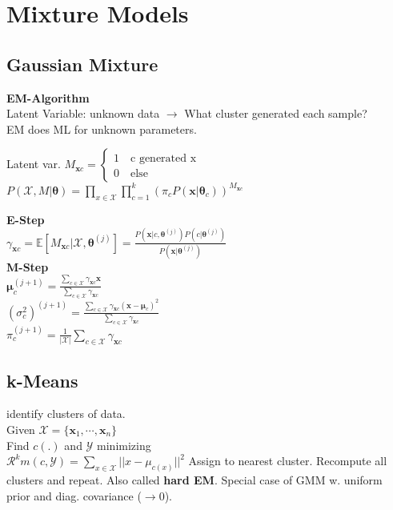 \section*{Mixture Models}

\subsection*{Gaussian Mixture}
\textbf{EM-Algorithm}\\
Latent Variable: unknown data $\rightarrow$ What cluster generated each sample?\\
EM does ML for unknown parameters.

Latent var. $M_{\mathbf{x}c}{=}\begin{cases} 
       1 \quad \text{c generated x}\\
       0 \quad \text{else}
       \end{cases} 
$\\
$P(\mathcal{X}, M|\mathbf{\theta}){=}\prod_{x\in\mathcal{X}}\prod_{c=1}^k(\pi_cP(\mathbf{x}|\mathbf{\theta}_c))^{M_{\mathbf{x}c}}$

\textbf{E-Step}\\
$ \gamma_{\mathbf{x}c}{=}\mathbb{E}[M_{\mathbf{x}c}|\mathcal{X},\mathbf{\theta}^{(j)}]{=}\frac{P(\mathbf{x}|c,\mathbf{\theta}^{(j)})P(c|\mathbf{\theta}^{(j)})}{P(\mathbf{x}|\mathbf{\theta}^{(j)})}$\\
\textbf{M-Step}\\
$\mathbf{\mu}_c^{(j+1)}=\frac{\sum_{c\in\mathcal{X}}\gamma_{\mathbf{x}c}\mathbf{x}}{\sum_{c\in\mathcal{X}}\gamma_{\mathbf{x}c}}$\\
$(\sigma_c^2)^{(j+1)}=\frac{\sum_{c\in\mathcal{X}}\gamma_{\mathbf{x}c}(\mathbf{x}-\mathbf{\mu}_c)^2}{\sum_{c\in\mathcal{X}}\gamma_{\mathbf{x}c}}$\\
$\pi_c^{(j+1)}=\frac{1}{|\mathcal{X}|}\sum_{c\in\mathcal{X}}\gamma_{\mathbf{x}c}$\\

\subsection*{k-Means}
identify clusters of data.\\
Given $\mathcal{X}=\{\mathbf{x}_1,\cdots,\mathbf{x}_n\}$\\
Find $c(.)$ and $\mathcal{Y}$ minimizing\\
$\mathcal{R}^km(c,\mathcal{Y})=\sum_{x\in\mathcal{X}}||x-\mu_{c(x)}||^2$
Assign to nearest cluster. Recompute all clusters and repeat. Also called \textbf{hard EM}. Special case of GMM w. uniform prior and diag. covariance ($\rightarrow 0$).